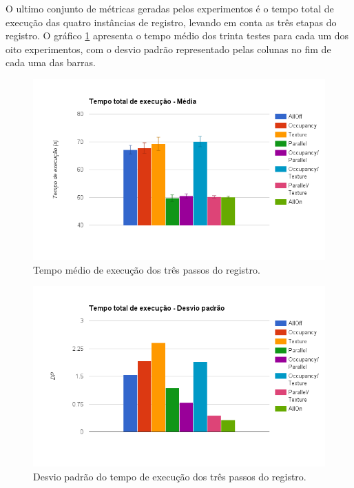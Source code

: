   O ultimo conjunto de métricas geradas pelos experimentos é o tempo total de
execução das quatro instâncias de registro, levando em conta as três etapas do
registro. O gráfico \ref{fig:chartAverage} apresenta o tempo médio dos trinta
testes para cada um dos oito experimentos, com o desvio padrão representado
pelas colunas no fim de cada uma das barras.

\begin{figure}[H]
    \centering
    \includegraphics[width=1.1\textwidth]{figuras/chartAverage.png}
    \caption{Tempo médio de execução dos três passos do registro.}
    \label{fig:chartAverage}
\end{figure}

\begin{figure}[H]
    \centering
    \includegraphics[width=1.1\textwidth]{figuras/chartDP.png}
    \caption{Desvio padrão do tempo de execução dos três passos do registro.}
    \label{fig:chartDP}
\end{figure}
